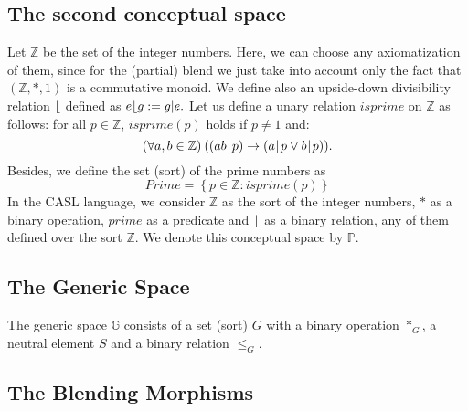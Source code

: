 \subsection{The second conceptual space}
Let $\mathbb{Z}$ be the set of the integer numbers. Here, we can
choose any axiomatization of them, since for the (partial) blend we
just take into account only the fact that $(\mathbb{Z},*,1)$ is a
commutative monoid.
We define also an upside-down divisibility relation $\lfloor$ defined as
%
$e\lfloor g:=g|e.$
Let us define a unary relation $isprime$ on $\mathbb{Z}$ as
follows: for all $p\in \mathbb{Z}$, $isprime(p)$ holds if $p\neq 1$
and:
%
\[(\forall a,b\in \mathbb{Z})\: ( (ab \lfloor p)\rightarrow (a \lfloor p \vee b \lfloor p) ).\] 
Besides, we define the set (sort) of the prime numbers as 
\[ Prime=\left\{ p\in \mathbb{Z}: isprime(p)\right\}\]
In the CASL language, we consider
$\mathbb{Z}$ as the sort of the integer numbers, $*$ as a binary
operation, $prime$ as a predicate and $\lfloor$ as a binary
relation, any of them defined over the sort $\mathbb{Z}$.
We denote this conceptual space by $\mathbb{P}$.


\subsection{The Generic Space}

The generic space $\mathbb{G}$ consists of a set (sort) $G$ with a
binary operation $*_G$, a neutral element $S$ and a binary relation
$\leq_G$.


\subsection{The Blending Morphisms}

